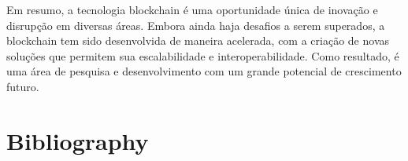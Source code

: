 \documentclass{article}
\begin{document}
Em resumo, a tecnologia blockchain é uma oportunidade única de inovação e disrupção em diversas áreas. Embora ainda haja desafios a serem superados, a blockchain tem sido desenvolvida de maneira acelerada, com a criação de novas soluções que permitem sua escalabilidade e interoperabilidade. Como resultado, é uma área de pesquisa e desenvolvimento com um grande potencial de crescimento futuro.

\section{Bibliography}
    
    \cite{MasteringBitcoin}
    \cite{TheTruthMachine}
    \cite{WhatisBitcoinTechnology}
    \cite{BlockchainTechnology}
    \cite{Bitcoincashsystem}
    \cite{BitcoinandCryptocurrency}
    \cite{BlockchainNewEconomy}
    \cite{BlockchainRevolution}
    \cite{NextGenerationSmartContract}
    
        
        
\end{document}
